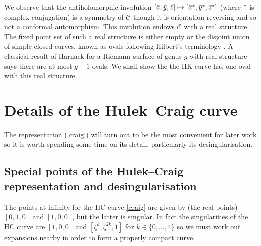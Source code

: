 \documentclass[pdftex]{sigma}
\numberwithin{equation}{section}
\newcommand{\cx}{\bar{x}}
\newcommand{\cy}{\bar{y}}
\newcommand{\cz}{\bar{z}}
\begin{document}
We observe that the antiholomorphic involution $[\cx,\cy,\cz]\mapsto [\cx\sp\ast,\cy\sp\ast,\cz\sp\ast]$
(where $\sp\ast$ is complex conjugation) is a symmetry of $\mathcal{C}$ though it is orientation-reversing and
so not a conformal automorphism.  This involution endows $\mathcal{C}$ with a real structure. The f\/ixed
 point set of such a real structure is either empty or the disjoint union of simple closed curves, known as ovals
 following Hilbert's terminology \cite{begg}. A classical result of Harnack for a Riemann surface of genus $g$ with real structure says there are at most $g+1$ ovals. We shall show the the HK curve has one oval with this real structure.


\section[Details of the Hulek-Craig curve]{Details of the Hulek--Craig curve}\label{section3}

The representation (\ref{craig}) will turn out to be the most convenient for later
work so it is worth spending some time on its detail, particularly its
desingularisation.

\subsection{Special points of the Hulek--Craig representation and
desingularisation}\label{section3.1}

The points at inf\/inity for the HC curve \eqref{craig} are
given by (the real points) $[0,1,0]$ and $[1,0,0]$, but the latter is singular.  In
fact the singularities of the HC curve are $[1,0,0]$ and $[\zeta^k,
\zeta^{2k}, 1]$ for $k\in\{0,\dots,4\}$ so we must work out expansions
nearby in order to form a properly compact curve.
\end{document}
